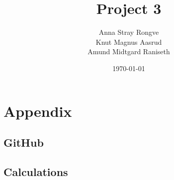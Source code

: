 \documentclass{article}
\title{Project 3}
\author{Anna Stray Rongve \\ Knut Magnus Aasrud \\ Amund Midtgard Raniseth}
\date{\today}
\begin{document}
\maketitle













\section{Appendix}
\subsection{GitHub}

\subsection{Calculations}
\end{document}
